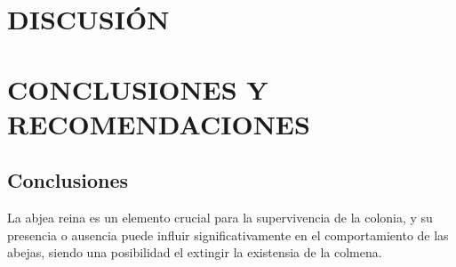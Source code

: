 \documentclass[12pt]{report}
\begin{document}

\pagebreak
\chapter{DISCUSIÓN}
\vspace{-3em}



\pagebreak
\chapter{CONCLUSIONES Y RECOMENDACIONES}


\section{Conclusiones}

\par La abjea reina es un elemento crucial para la supervivencia de la colonia, y su presencia o ausencia puede influir significativamente en el comportamiento de las abejas, siendo una posibilidad el extingir la existensia de la colmena.


\end{document}
